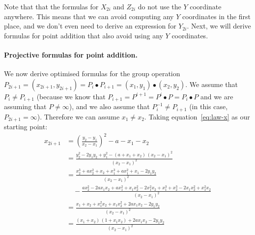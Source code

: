 \documentclass{article}
\begin{document}
Note that that the formulas for $X_{2i}$ and $Z_{2i}$ do not use the $Y$ coordinate anywhere.
This means that we can avoid computing any $Y$ coordinates in the first place, and we don't even need to derive an expression for $Y_{2i}$.
Next, we will derive formulas for point addition that also avoid using any $Y$ coordinates.

\paragraph{Projective formulas for point addition.}

We now derive optimised formulas for the group operation
$P_{2i+1} = (x_{2i+1}, y_{2i+1}) = P_i \bullet P_{i+1} = (x_1, y_1) \bullet (x_2, y_2)$.
We assume that $P_i \ne P_{i+1}$ (because we know that $P_{i+1} = P^{i+1} = P^i \bullet P = P_i \bullet P$ and we are assuming that $P \ne \infty$), and we also assume that $P_i^{-1} \ne P_{i+1}$ (in this case, $P_{2i+1} = \infty$).
Therefore we can assume $x_1 \neq x_2$.
Taking equation~\eqref{eq:law-x} as our starting point:
\begin{align}
x_{2i+1} &= \left(\frac{y_2 - y_1}{x_2 - x_1}\right)^2 - a - x_1 - x_2 \nonumber\\[5pt]
&= \frac{y_2^2 - 2y_1 y_2 + y_1^2 - (a + x_1 + x_2)\,(x_2 - x_1)^2}{(x_2 - x_1)^2} \nonumber\\[5pt]
&= \frac{x_2^3 + ax_2^2 + x_2 + x_1^3 + ax_1^2 + x_1 - 2y_1 y_2}{(x_2 - x_1)^2} \nonumber\\
    &\quad - \frac{ax_2^2 - 2ax_1 x_2 + ax_1^2 + x_1 x_2^2 - 2 x_1^2 x_2 + x_1^3 + x_2^3 - 2x_1 x_2^2 + x_1^2 x_2}{(x_2 - x_1)^2} \nonumber\\[5pt]
&= \frac{x_1 + x_2 + x_1^2 x_2 + x_1 x_2^2 + 2a x_1 x_2 - 2y_1 y_2}{(x_2 - x_1)^2} \nonumber\\[5pt]
&= \frac{(x_1 + x_2)\,(1 + x_1 x_2) + 2a x_1 x_2 - 2y_1 y_2}{(x_2 - x_1)^2} \label{eq:add-x}
\end{align}
\end{document}
